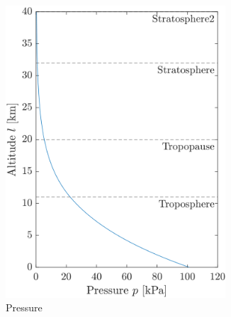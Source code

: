 \begin{figure}[ht]
    \centering
    \begin{subfigure}{0.32\textwidth}
        \includegraphics[width=0.9\textwidth]{images-design/model_atmosphere-pressure.png}
        \caption{Pressure}
        \label{fig:atmos-pressure}
    \end{subfigure}
    \begin{subfigure}{0.32\textwidth}

\end{subfigure}
\end{figure}
